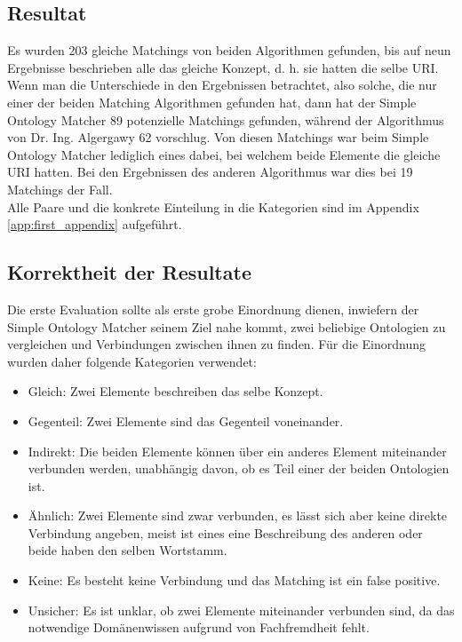 		\subsection{Resultat}
		Es wurden 203 gleiche Matchings von beiden Algorithmen gefunden, bis auf neun
		Ergebnisse beschrieben alle das gleiche Konzept, d. h. sie hatten die selbe
		URI.
		Wenn man die Unterschiede in den Ergebnissen betrachtet, also solche, die nur
		einer der beiden Matching Algorithmen gefunden hat, dann hat der Simple
		Ontology Matcher 89 potenzielle Matchings gefunden, während der Algorithmus
		von Dr. Ing. Algergawy 62 vorschlug. Von diesen Matchings war beim Simple
		Ontology Matcher lediglich eines dabei, bei welchem beide Elemente die gleiche
		URI hatten. Bei den Ergebnissen des anderen Algorithmus war dies bei 19
		Matchings der Fall.\\
		Alle Paare und die konkrete Einteilung in die Kategorien sind im Appendix
		\ref{app:first_appendix}
		aufgeführt.
		
		\subsection{Korrektheit der Resultate}
		Die erste Evaluation sollte als erste grobe Einordnung dienen, inwiefern
		der Simple Ontology Matcher seinem Ziel nahe kommt, zwei beliebige Ontologien
		zu vergleichen und Verbindungen zwischen ihnen zu finden. Für die Einordnung
		wurden daher folgende Kategorien verwendet:\\
		\begin{itemize}
		  \item Gleich: Zwei Elemente beschreiben das selbe Konzept.
		  \item Gegenteil: Zwei Elemente sind das Gegenteil voneinander.
		  \item Indirekt: Die beiden Elemente können über ein anderes Element
		  miteinander verbunden werden, unabhängig davon, ob es Teil einer der beiden
		  Ontologien ist.
		  \item Ähnlich: Zwei Elemente sind zwar verbunden, es lässt sich aber keine
		  direkte Verbindung angeben, meist ist eines eine Beschreibung des anderen
		  oder beide haben den selben Wortstamm.
		  \item Keine: Es besteht keine Verbindung und das Matching ist ein false
		  positive.
		  \item Unsicher: Es ist unklar, ob zwei Elemente miteinander verbunden sind,
		  da das notwendige Domänenwissen aufgrund von Fachfremdheit fehlt.
		\end{itemize}
		
